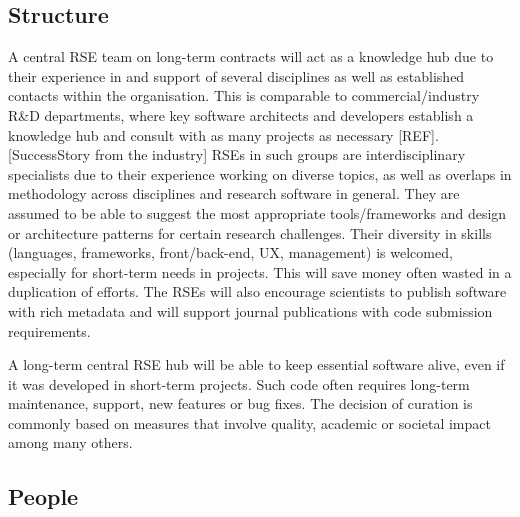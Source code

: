 \documentclass{article}
\begin{document}
\subsection{Structure}

A central RSE team on long-term contracts will act as a knowledge hub due to their experience in and support of several disciplines as well as established contacts within the organisation.
This is comparable to commercial/industry R\&D departments, where key software architects and developers establish a knowledge hub and consult with as many projects as necessary [REF].
[SuccessStory from the industry]
RSEs in such groups are interdisciplinary specialists due to their experience working on diverse topics, as well as overlaps in methodology across disciplines and research software in general.
They are assumed to be able to suggest the most appropriate tools/frameworks and design or architecture patterns for certain research challenges.
Their diversity in skills (languages, frameworks, front/back-end, UX, management) is welcomed, especially for short-term needs in projects.
This will save money often wasted in a duplication of efforts.
The RSEs will also encourage scientists to publish software with rich metadata and will support journal publications with code submission requirements.

A long-term central RSE hub will be able to keep essential software alive, even if it was developed in short-term projects.
Such code often requires long-term maintenance, support, new features or bug fixes.
The decision of curation is commonly based on measures that involve quality, academic or societal impact among many others.

\subsection{People}
\end{document}
